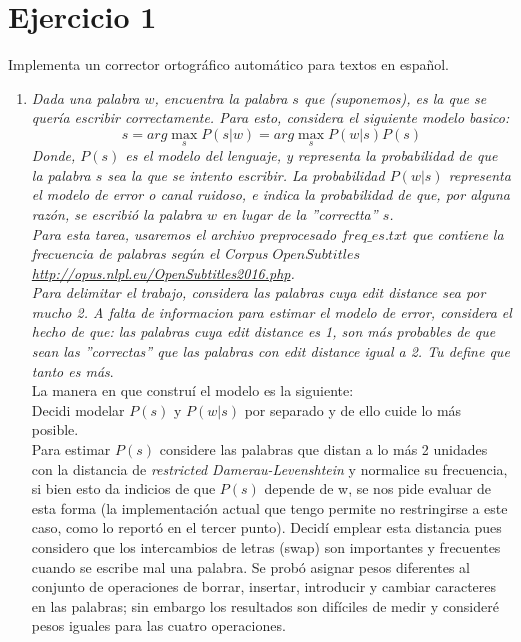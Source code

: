 \documentclass[paper=letter, fontsize=11pt]{scrartcl}
\numberwithin{equation}{section} %
\numberwithin{figure}{section} %
\numberwithin{table}{section} %
\begin{document}
\section{Ejercicio 1}
Implementa un corrector ortográfico automático para textos en español.
\begin{enumerate}
\item \textit{Dada una palabra $w$, encuentra la palabra $s$ que (suponemos), es la que se quería escribir correctamente. Para esto, considera el siguiente modelo basico:\\}
$$s=arg \max_s P(s|w)=arg \max_s P(w|s)P(s)$$
\textit{Donde, $P(s)$ es el modelo del lenguaje, y representa la probabilidad de que la palabra $s$ sea la que se intento escribir. La probabilidad $P(w|s)$ representa el modelo de error o canal ruidoso, e indica la probabilidad de que, por alguna razón, se escribió la palabra $w$ en lugar de la ''correctta'' $s$.}\\
\textit{Para esta tarea, usaremos el archivo preprocesado $freq\_es.txt$ que contiene la frecuencia de palabras según el Corpus $OpenSubtitles$ 
\url{http://opus.nlpl.eu/OpenSubtitles2016.php}.}\\
\textit{Para delimitar el trabajo, considera las palabras cuya edit distance sea por mucho 2. A falta de informacion para estimar el modelo de error, considera el hecho de que: las palabras cuya edit distance es 1, son más probables de que sean las ''correctas'' que las palabras con edit distance igual a 2. Tu define que tanto es más}.\\

La manera en que construí el modelo es la siguiente:\\
Decidi modelar $P(s)$ y $P(w|s)$ por separado y de ello cuide lo más posible.\\

Para estimar $P(s)$ considere las palabras que distan a lo más 2 unidades con la distancia de \textit{restricted Damerau-Levenshtein} y normalice su frecuencia, si bien esto da indicios de que $P(s)$ depende de w, se nos pide evaluar de esta forma (la implementación actual que tengo permite no restringirse a este caso, como lo reportó en el tercer punto). Decidí emplear esta distancia pues considero que los intercambios de letras (swap) son importantes y frecuentes cuando se escribe mal una palabra. Se probó asignar pesos diferentes al conjunto de operaciones de borrar, insertar, introducir y cambiar caracteres en las palabras; sin embargo los resultados son difíciles de medir y consideré pesos iguales para las cuatro operaciones.\\


\end{enumerate}
\end{document}
